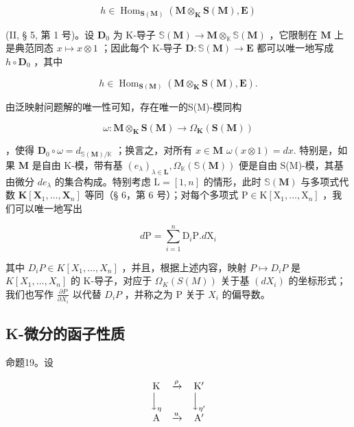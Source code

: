 \[
h \in \operatorname{Hom} _ {\mathbf {S} (\mathbf {M})} (\mathbf {M} \otimes_ {\mathbf {K}} \mathbf {S} (\mathbf {M}), \mathbf {E})
\]

(II, § 5, 第 1 号)。设 \(\mathbf{D}_0\) 为 K-导子 \(\mathbb{S}(\mathbf{M}) \to \mathbf{M} \otimes_{\mathbb{K}} \mathbb{S}(\mathbf{M})\) ，它限制在 \(\mathbf{M}\) 上是典范同态 \(x \mapsto x \otimes 1\) ；因此每个 K-导子 \(\mathbf{D}: \mathbb{S}(\mathbf{M}) \to \mathbf{E}\) 都可以唯一地写成 \(h \circ \mathbf{D}_0\) ，其中

\[
h \in \operatorname{Hom} _ {\mathbf {S} (\mathbf {M})} (\mathbf {M} \otimes_ {\mathbf {K}} \mathbf {S} (\mathbf {M}), \mathbf {E}).
\]

由泛映射问题解的唯一性可知，存在唯一的S(M)-模同构

\[
\omega : \mathbf {M} \otimes_ {\mathbf {K}} \mathbf {S} (\mathbf {M}) \rightarrow \Omega_ {\mathbf {K}} (\mathbf {S} (\mathbf {M}))
\]

，使得 \(\mathbf{D}_0\circ \omega = d_{\mathbb{S}(\mathbf{M}) / \mathbb{K}}\) ；换言之，对所有 \(x\in \mathbf{M}\) \(\omega (x\otimes 1) = dx.\) 特别是，如果 \(\mathbf{M}\) 是自由 K-模，带有基 \((e_{\lambda})_{\lambda \in \mathbf{L}},\Omega_{\mathbb{K}}(\mathbb{S}(\mathbf{M}))\) 便是自由 S(M)-模，其基由微分 \(de_{\lambda}\) 的集合构成。特别考虑 \(\mathrm{L} = [1,n]\) 的情形，此时 \(\mathbb{S}(\mathbf{M})\) 与多项式代数 \(\mathbf{K}[\mathbf{X}_1,\dots ,\mathbf{X}_n]\) 等同（§ 6，第 6 号）；对每个多项式 \(\mathrm{P}\in \mathrm{K}[\mathrm{X}_1,\dots ,\mathrm{X}_n]\) ，我们可以唯一地写出

\[
d \mathrm{P} = \sum_ {i = 1} ^ {n} \mathrm{D} _ {i} \mathrm{P}. d \mathrm{X} _ {i}
\]

其中 \(D_{i}P \in K[X_{1}, \ldots, X_{n}]\) ，并且，根据上述内容，映射 \(P \mapsto D_{i}P\) 是 \(K[X_{1}, \ldots, X_{n}]\) 的 K-导子，对应于 \(\Omega_{K}(S(M))\) 关于基 \((dX_{i})\) 的坐标形式；我们也写作 \(\frac{\partial P}{\partial X_{i}}\) 以代替 \(D_{i}P\) ，并称之为 P 关于 \(X_{i}\) 的偏导数。

\subsection{K-微分的函子性质}

命题19。设

\[
\begin{array}{c c c} \mathrm{K} & \xrightarrow {\rho} & \mathrm{K} ^ {\prime} \\ \Big \downarrow_ {\eta} & & \Big \downarrow_ {\eta^ {\prime}} \\ \mathrm{A} & \xrightarrow {u} & \mathrm{A} ^ {\prime} \end{array}
\]

